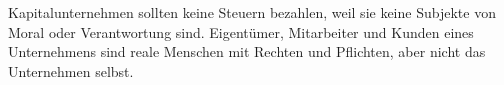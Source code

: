 Kapitalunternehmen sollten keine Steuern bezahlen, weil sie keine Subjekte von Moral oder Verantwortung sind.
Eigentümer, Mitarbeiter und Kunden eines Unternehmens sind reale Menschen mit Rechten und Pflichten, aber nicht das Unternehmen selbst.